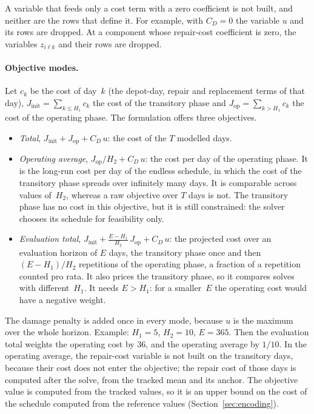 \documentclass[11pt,a4paper]{article}
\theoremstyle{plain}
\theoremstyle{definition}
\theoremstyle{remark}
\begin{document}
A variable that feeds only a cost term with a zero coefficient is not built, and neither are the rows that define it.
For example, with $C_D = 0$ the variable $u$ and its rows are dropped.
At a component whose repair-cost coefficient is zero, the variables $z_{i\ell k}$ and their rows are dropped.

\paragraph{Objective modes.}
Let $c_k$ be the cost of day~$k$ (the depot-day, repair and replacement terms of that day), $J_{\mathrm{init}} = \sum_{k \le H_1} c_k$ the cost of the transitory phase and $J_{\mathrm{op}} = \sum_{k > H_1} c_k$ the cost of the operating phase.
The formulation offers three objectives.
\begin{itemize}[nosep]
  \item \emph{Total}, $J_{\mathrm{init}} + J_{\mathrm{op}} + C_D\,u$: the cost of the $T$ modelled days.
  \item \emph{Operating average}, $J_{\mathrm{op}}/H_2 + C_D\,u$: the cost per day of the operating phase.
    It is the long-run cost per day of the endless schedule, in which the cost of the transitory phase spreads over infinitely many days.
    It is comparable across values of~$H_2$, whereas a raw objective over $T$ days is not.
    The transitory phase has no cost in this objective, but it is still constrained: the solver chooses its schedule for feasibility only.
  \item \emph{Evaluation total}, $J_{\mathrm{init}} + \frac{E - H_1}{H_2}\,J_{\mathrm{op}} + C_D\,u$: the projected cost over an evaluation horizon of $E$ days, the transitory phase once and then $(E - H_1)/H_2$ repetitions of the operating phase, a fraction of a repetition counted pro rata.
    It also prices the transitory phase, so it compares solves with different~$H_1$.
    It needs $E > H_1$: for a smaller~$E$ the operating cost would have a negative weight.
\end{itemize}
The damage penalty is added once in every mode, because $u$ is the maximum over the whole horizon.
Example: $H_1 = 5$, $H_2 = 10$, $E = 365$.
Then the evaluation total weights the operating cost by $36$, and the operating average by $1/10$.
In the operating average, the repair-cost variable is not built on the transitory days, because their cost does not enter the objective; the repair cost of those days is computed after the solve, from the tracked mean and its anchor.
The objective value is computed from the tracked values, so it is an upper bound on the cost of the schedule computed from the reference values (Section~\ref{sec:encoding}).
\end{document}
